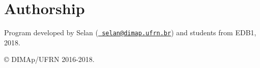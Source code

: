 \section*{Authorship}

Program developed by Selan (\href{mailto:selan@dimap.ufrn.br}{\texttt{ selan@dimap.\+ufrn.\+br}}) and students from E\+D\+B1, 2018.

\copyright{} D\+I\+M\+Ap/\+U\+F\+RN 2016-\/2018. 